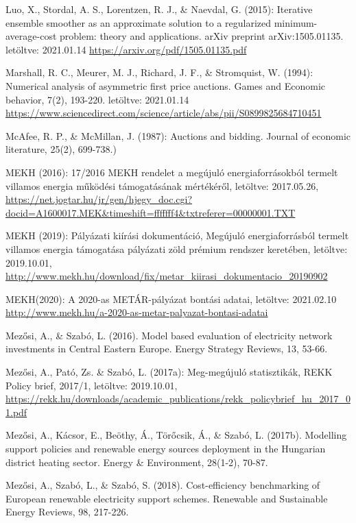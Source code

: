 \documentclass[twoside, magyar, showtrims]{corvinusphd}
\begin{document}
\begin{thebibliography}{99}
Luo, X., Stordal, A. S., Lorentzen, R. J., \& Naevdal, G. (2015): Iterative ensemble smoother as an approximate solution to a regularized minimum-average-cost problem: theory and applications. arXiv preprint arXiv:1505.01135. letöltve: 2021.01.14
\url{https://arxiv.org/pdf/1505.01135.pdf}

Marshall, R. C., Meurer, M. J., Richard, J. F., \& Stromquist, W. (1994): Numerical analysis of asymmetric first price auctions. Games and Economic behavior, 7(2), 193-220.
letöltve: 2021.01.14
\url{https://www.sciencedirect.com/science/article/abs/pii/S0899825684710451}

McAfee, R. P., \& McMillan, J. (1987): Auctions and bidding. Journal of economic literature, 25(2), 699-738.)

MEKH (2016): 17/2016 MEKH rendelet a megújuló energiaforrásokból termelt villamos energia működési támogatásának mértékéről, letöltve: 2017.05.26,
\url{https://net.jogtar.hu/jr/gen/hjegy\_doc.cgi?docid=A1600017.MEK\&timeshift=fffffff4\&txtreferer=00000001.TXT}

MEKH (2019): Pályázati kiírási dokumentáció, Megújuló energiaforrásból termelt villamos energia támogatása pályázati zöld prémium rendszer keretében, letöltve: 2019.10.01,
\url{http://www.mekh.hu/download/fix/metar\_kiirasi\_dokumentacio\_20190902}

MEKH(2020): A 2020-as METÁR-pályázat bontási adatai, letöltve: 2021.02.10
\url{http://www.mekh.hu/a-2020-as-metar-palyazat-bontasi-adatai}

Mezősi, A., \& Szabó, L. (2016). Model based evaluation of electricity network investments in Central Eastern Europe. Energy Strategy Reviews, 13, 53-66.

Mezősi, A., Pató, Zs. \& Szabó, L. (2017a): Meg-megújuló statisztikák, REKK Policy brief, 2017/1, letöltve: 2019.10.01,
\url{https://rekk.hu/downloads/academic\_publications/rekk\_policybrief\_hu\_2017\_01.pdf}

Mezősi, A., Kácsor, E., Beöthy, Á., Törőcsik, Á., \& Szabó, L. (2017b). Modelling support policies and renewable energy sources deployment in the Hungarian district heating sector. Energy \& Environment, 28(1-2), 70-87.

Mezősi, A., Szabó, L., \& Szabó, S. (2018). Cost-efficiency benchmarking of European renewable electricity support schemes. Renewable and Sustainable Energy Reviews, 98, 217-226.


\end{thebibliography}
\end{document}
